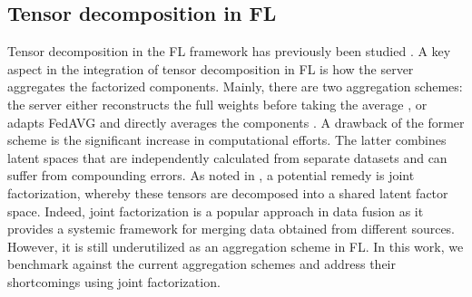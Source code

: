 \subsection{Tensor decomposition in FL}
Tensor decomposition in the FL framework has previously been studied \cite{yi2023fedlora, qi2024fdlora, park2024communicationefficientfederatedlowrankupdate}. A key aspect in the integration of tensor decomposition in FL is how the server aggregates the factorized components. Mainly, there are two aggregation schemes: the server either reconstructs the full weights before taking the average \cite{dai2023deep, lan2023communication, liu2024marvel}, or adapts FedAVG and directly averages the components \cite{sanchez2024federated, zheng2021distributed, zhang2024federated}. A drawback of the former scheme is the significant increase in computational efforts. The latter combines latent spaces that are independently calculated from separate datasets and can suffer from compounding errors. As noted in \cite{wu2022tenalign}, a potential remedy is joint factorization, whereby these tensors are decomposed into a shared latent factor space. Indeed, joint factorization is a popular approach in data fusion \cite{nie2024interpretable, zhou2023multi} as it provides a systemic framework for merging data obtained from different sources. However, it is still underutilized as an aggregation scheme in FL. In this work, we benchmark against the current aggregation schemes and address their shortcomings using joint factorization. 

